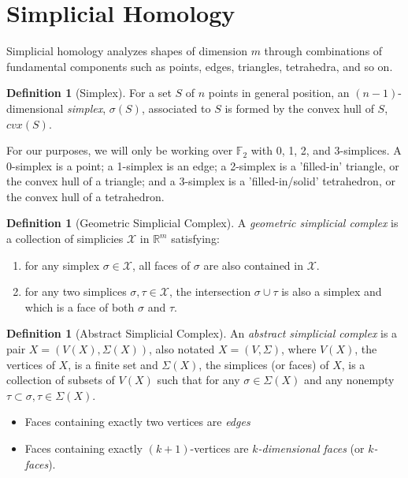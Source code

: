 \documentclass[ma]{uncgdissertationexp}
\theoremstyle{plain}
\theoremstyle{definition}
\newtheorem{definition}[theorem]{Definition}
\theoremstyle{remark}
\begin{document}
\section{Simplicial Homology}

\par Simplicial homology analyzes shapes of dimension $m$ through combinations of fundamental components such as points, edges, triangles, tetrahedra, and so on.

\begin{definition}[Simplex]
\par For a set $S$ of $n$ points in general position, an $(n-1)$-dimensional \textit{simplex}, $\sigma(S)$, associated to $S$ is formed by the convex hull of $S$, $cvx(S)$.
\end{definition}

\par For our purposes, we will only be working over $\mathbb{F}_2$ with 0, 1, 2, and 3-simplices. A 0-simplex is a point; a 1-simplex is an edge; a 2-simplex is a 'filled-in' triangle, or the convex hull of a triangle; and a 3-simplex is a 'filled-in/solid' tetrahedron, or the convex hull of a tetrahedron.

\begin{definition}[Geometric Simplicial Complex]
\par A \textit{geometric simplicial complex} is a collection of simplicies $\mathcal{X}$ in $\mathbb{R}^m$ satisfying:
\begin{enumerate}
\item for any simplex $\sigma \in \mathcal{X}$, all faces of $\sigma$ are also contained in $\mathcal{X}$.
\item for any two simplices $\sigma, \tau \in \mathcal{X}$, the intersection $\sigma \cup \tau$ is also a simplex and which is a face of both $
\sigma$ and $\tau$. 
\end{enumerate}
\end{definition}

\begin{definition}[Abstract Simplicial Complex]
\par An \textit{abstract simplicial complex} is a pair $X = (V(X), \Sigma(X))$, also notated $X=(V,\Sigma)$, where $V(X)$, the vertices of $X$, is a finite set and $\Sigma(X)$, the simplices (or faces) of $X$, is a collection of subsets of $V(X)$ such that for any $\sigma \in \Sigma(X)$ and any nonempty $\tau \subset \sigma, \tau \in \Sigma(X)$.
\begin{itemize}
\item Faces containing exactly two vertices are \textit{edges}
\item Faces containing exactly $(k+1)$-vertices are $k$\textit{-dimensional faces} (or $k$\textit{-faces}).
\end{itemize}
\end{definition}
\end{document}
